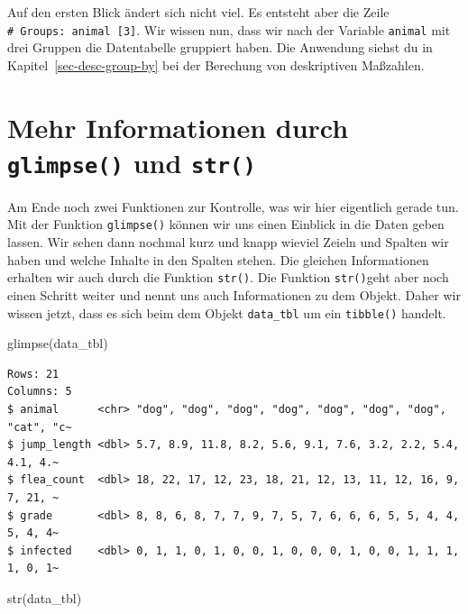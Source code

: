 \documentclass[
  letterpaper,
]{scrbook}
\newenvironment{Shaded}{\begin{snugshade}}{\end{snugshade}}
\newcommand{\FunctionTok}[1]{\textcolor[rgb]{0.28,0.35,0.67}{#1}}
\newcommand{\NormalTok}[1]{\textcolor[rgb]{0.00,0.23,0.31}{#1}}
\begin{document}
Auf den ersten Blick ändert sich nicht viel. Es entsteht aber die Zeile
\texttt{\#\ Groups:\ animal\ {[}3{]}}. Wir wissen nun, dass wir nach der
Variable \texttt{animal} mit drei Gruppen die Datentabelle gruppiert
haben. Die Anwendung siehst du in Kapitel~\ref{sec-desc-group-by} bei
der Berechung von deskriptiven Maßzahlen.

\hypertarget{mehr-informationen-durch-glimpse-und-str}{%
\section{\texorpdfstring{Mehr Informationen durch \texttt{glimpse()} und
\texttt{str()}}{Mehr Informationen durch glimpse() und str()}}\label{mehr-informationen-durch-glimpse-und-str}}

Am Ende noch zwei Funktionen zur Kontrolle, was wir hier eigentlich
gerade tun. Mit der Funktion \texttt{glimpse()} können wir uns einen
Einblick in die Daten geben lassen. Wir sehen dann nochmal kurz und
knapp wieviel Zeieln und Spalten wir haben und welche Inhalte in den
Spalten stehen. Die gleichen Informationen erhalten wir auch durch die
Funktion \texttt{str()}. Die Funktion \texttt{str()}geht aber noch einen
Schritt weiter und nennt uns auch Informationen zu dem Objekt. Daher wir
wissen jetzt, dass es sich beim dem Objekt \texttt{data\_tbl} um ein
\texttt{tibble()} handelt.

\begin{Shaded}
\begin{Highlighting}[]
\FunctionTok{glimpse}\NormalTok{(data\_tbl)}
\end{Highlighting}
\end{Shaded}

\begin{verbatim}
Rows: 21
Columns: 5
$ animal      <chr> "dog", "dog", "dog", "dog", "dog", "dog", "dog", "cat", "c~
$ jump_length <dbl> 5.7, 8.9, 11.8, 8.2, 5.6, 9.1, 7.6, 3.2, 2.2, 5.4, 4.1, 4.~
$ flea_count  <dbl> 18, 22, 17, 12, 23, 18, 21, 12, 13, 11, 12, 16, 9, 7, 21, ~
$ grade       <dbl> 8, 8, 6, 8, 7, 7, 9, 7, 5, 7, 6, 6, 6, 5, 5, 4, 4, 5, 4, 4~
$ infected    <dbl> 0, 1, 1, 0, 1, 0, 0, 1, 0, 0, 0, 1, 0, 0, 1, 1, 1, 1, 0, 1~
\end{verbatim}

\begin{Shaded}
\begin{Highlighting}[]
\FunctionTok{str}\NormalTok{(data\_tbl)}
\end{Highlighting}
\end{Shaded}
\end{document}
